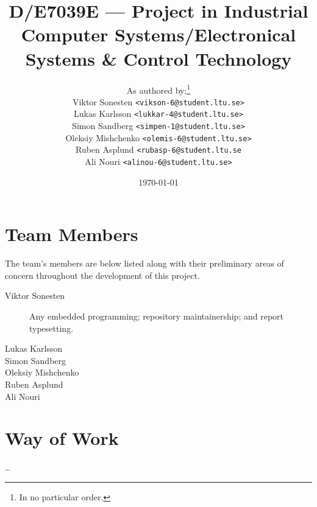 \documentclass[twocolumn]{article}
\title{D/E7039E --- Project in Industrial Computer Systems/Electronical Systems \& Control Technology}
\author{
As authored by:\footnote{In no particular order.} \\
Viktor Sonesten \texttt{<vikson-6@student.ltu.se>} \\
Lukas Karlsson \texttt{<lukkar-4@student.ltu.se>} \\
Simon Sandberg \texttt{<simpen-1@student.ltu.se>} \\
Oleksiy Mishchenko \texttt{<olemis-6@student.ltu.se>} \\
Ruben Asplund \texttt{<rubasp-6@student.ltu.se} \\
Ali Nouri \texttt{<alinou-6@student.ltu.se>}
}
\date{\today}
\begin{document}
\maketitle

\appendix
\section{Team Members}
The team's members are below listed along with their preliminary areas of concern throughout the development of this project.

\begin{description}
    \item[Viktor Sonesten]
    Any embedded programming;
    repository maintainership; and
    report typesetting.

    \item[Lukas Karlsson]
    \item[Simon Sandberg]
    \item[Oleksiy Mishchenko]
    \item[Ruben Asplund]
    \item[Ali Nouri]
\end{description}

\section{Way of Work}
\ldots
\end{document}
